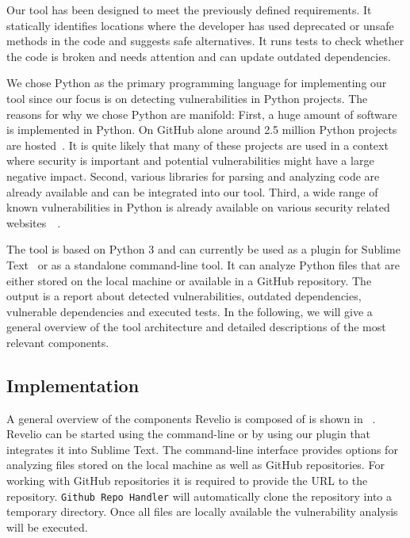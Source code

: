 Our tool has been designed to meet the previously defined requirements. It statically identifies locations where the developer has used deprecated or unsafe methods in the code and suggests safe alternatives. It runs tests to check whether the code is broken and needs attention and can update outdated dependencies.

We chose Python as the primary programming language for implementing our tool since our focus is on detecting vulnerabilities in Python projects. The reasons for why we chose Python are manifold: First, a huge amount of software is implemented in Python. On GitHub alone around 2.5 million Python projects are hosted~\cite{ghpython}. It is quite likely that many of these projects are used in a context where security is important and potential vulnerabilities might have a large negative impact. Second, various libraries for parsing and analyzing code are already available and can be integrated into our tool. Third, a wide range of known vulnerabilities in Python is already available on various security related websites~\cite{cvedetails}~\cite{openstack}. 

The tool is based on Python 3 and can currently be used as a plugin for Sublime Text~\cite{sublime} or as a standalone command-line tool. It can analyze Python files that are either stored on the local machine or available in a GitHub repository. The output is a report about detected vulnerabilities, outdated dependencies, vulnerable dependencies and executed tests. In the following, we will give a general overview of the tool architecture and detailed descriptions of the most relevant components.

\subsection{Implementation}


A general overview of the components Revelio is composed of is shown in ~. Revelio can be started using the command-line or by using our plugin that integrates it into Sublime Text. The command-line interface provides options for analyzing files stored on the local machine as well as GitHub repositories. For working with GitHub repositories it is required to provide the URL to the repository. \texttt{Github Repo Handler} will automatically clone the repository into a temporary directory. Once all files are locally available the vulnerability analysis will be executed.

